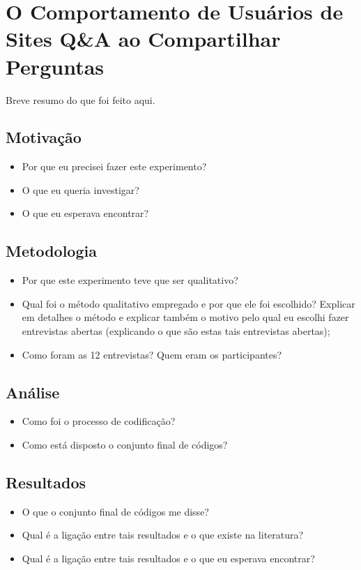 \chapter{O Comportamento de Usuários de Sites Q\&A ao Compartilhar Perguntas}
Breve resumo do que foi feito aqui.
\section{Motivação}
\begin{itemize}
\item Por que eu precisei fazer este experimento? 
\item O que eu queria investigar?
\item O que eu esperava encontrar?
\end{itemize}
\section{Metodologia}
\begin{itemize}
\item Por que este experimento teve que ser qualitativo?
\item Qual foi o método qualitativo empregado e por que ele foi escolhido? Explicar em detalhes o método e explicar também o motivo pelo qual eu escolhi fazer entrevistas abertas (explicando o que são estas tais entrevistas abertas);
\item Como foram as 12 entrevistas? Quem eram os participantes?
\end{itemize}
\section{Análise}
\begin{itemize}
\item Como foi o processo de codificação?
\item Como está disposto o conjunto final de códigos?
\end{itemize}
\section{Resultados}
\begin{itemize}
\item O que o conjunto final de códigos me disse?
\item Qual é a ligação entre tais resultados e o que existe na literatura?
\item Qual é a ligação entre tais resultados e o que eu esperava encontrar?
\end{itemize}